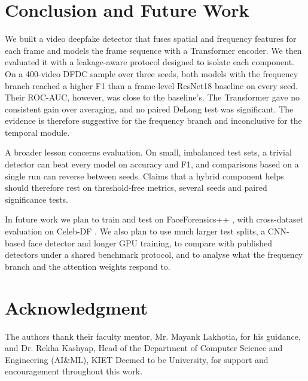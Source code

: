 \documentclass[conference]{IEEEtran}
\begin{document}
\section{Conclusion and Future Work}

We built a video deepfake detector that fuses spatial and frequency features
for each frame and models the frame sequence with a Transformer encoder. We
then evaluated it with a leakage-aware protocol designed to isolate each
component. On a 400-video DFDC sample over three seeds, both models with the
frequency branch reached a higher F1 than a frame-level ResNet18 baseline on
every seed. Their ROC-AUC, however, was close to the baseline's. The
Transformer gave no consistent gain over averaging, and no paired DeLong test
was significant. The evidence is therefore suggestive for the frequency branch
and inconclusive for the temporal module.

A broader lesson concerns evaluation. On small, imbalanced test sets, a
trivial detector can beat every model on accuracy and F1, and comparisons
based on a single run can reverse between seeds. Claims that a hybrid
component helps should therefore rest on threshold-free metrics, several
seeds and paired significance tests.

In future work we plan to train and test on FaceForensics++
\cite{rossler2019faceforensics}, with cross-dataset evaluation on Celeb-DF
\cite{li2020celeb}. We also plan to use much larger test splits, a CNN-based
face detector and longer GPU training, to compare with published detectors
under a shared benchmark protocol, and to analyse what the frequency branch
and the attention weights respond to.

\section*{Acknowledgment}
The authors thank their faculty mentor, Mr. Mayank Lakhotia, for his
guidance, and Dr. Rekha Kashyap, Head of the Department of Computer Science
and Engineering (AI\&ML), KIET Deemed to be University, for support and
encouragement throughout this work.
\end{document}
